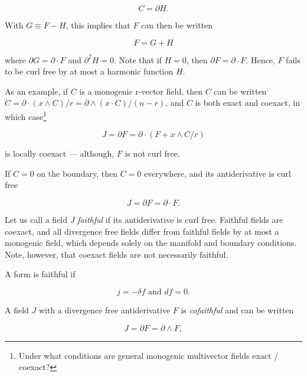 \documentclass[twocolumn]{article}
\begin{document}
\begin{equation}
  C = \partial H.
\end{equation}

With $G \equiv F - H$, this implies that $F$ can then be written

\begin{equation}
  F = G + H\label{eq:harmonic-split}
\end{equation}

where $\partial G = \partial \cdot F$ and $\partial^2 H = 0$. Note that if $H=0$, then $\partial F = \partial \cdot F$. Hence, $F$ fails to be curl free by at most a harmonic function $H$.

As an example, if $C$ is a monogenic r-vector field, then $C$ can be written $C = \partial \cdot (x \wedge C)/r = \partial \wedge (x \cdot C)/(n-r)$, and $C$ is both exact and coexact, in which case\footnote{Under what conditions are general monogenic multivector fields exact / coexact?}

\begin{equation}
  J = \partial F = \partial \cdot (F + x \wedge C/r)\label{eq:unfaithful}
\end{equation}

is locally coexact --- although, $F$ is not curl free. 

If $C = 0$ on the boundary, then $C = 0$ everywhere, and its antiderivative is curl free

\begin{equation}
  J = \partial F = \partial \cdot F. \label{eq:faithful}
\end{equation}

Let us call a field $J$ \emph{faithful} if its antiderivative is curl free. Faithful fields are coexact, and all divergence free fields differ from faithful fields by at most a monogenic field, which depends solely on the manifold and boundary conditions. Note, however, that coexact fields are not necessarily faithful. 

A form is faithful if

\begin{equation}
  j = - \delta f \text { and } df = 0.
\end{equation}

A field $J$ with a divergence free antiderivative $F$ is \emph{cofaithful} and can be written

\begin{equation}
  J = \partial F = \partial \wedge F,
\end{equation}
\end{document}
